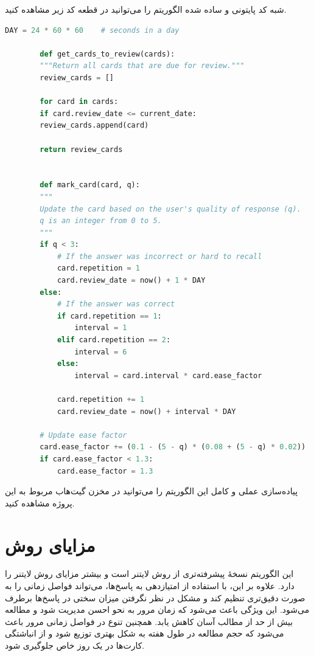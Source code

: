 \documentclass[12pt]{report}
\begin{document}
شبه کد پایتونی و ساده شده الگوریتم  را می‌توانید در قطعه کد زیر مشاهده کنید.
\begin{latin}
    
    \begin{lstlisting}[language=Python]
        DAY = 24 * 60 * 60    # seconds in a day
        
        def get_cards_to_review(cards):
        """Return all cards that are due for review."""
        review_cards = []
        
        for card in cards:
        if card.review_date <= current_date:
        review_cards.append(card)
        
        return review_cards
        
        
        def mark_card(card, q):
        """
        Update the card based on the user's quality of response (q).
        q is an integer from 0 to 5.
        """
        if q < 3:
            # If the answer was incorrect or hard to recall
            card.repetition = 1
            card.review_date = now() + 1 * DAY
        else:
            # If the answer was correct
            if card.repetition == 1:
                interval = 1
            elif card.repetition == 2:
                interval = 6
            else:
                interval = card.interval * card.ease_factor
            
            card.repetition += 1
            card.review_date = now() + interval * DAY
            
        # Update ease factor
        card.ease_factor += (0.1 - (5 - q) * (0.08 + (5 - q) * 0.02))
        if card.ease_factor < 1.3:
            card.ease_factor = 1.3
    \end{lstlisting}
\end{latin}

پیاده‌سازی عملی و کامل این الگوریتم را می‌توانید در مخزن گیت‌هاب مربوط به این پروژه مشاهده کنید.

\section{مزایای روش }
این الگوریتم نسخهٔ پیشرفته‌تری از روش لایتنر است و بیشتر مزایای روش لایتنر را دارد.
    علاوه بر این، با استفاده از امتیازدهی به پاسخ‌ها، می‌تواند فواصل زمانی را به صورت دقیق‌تری تنظیم کند و مشکل در نظر نگرفتن میزان سختی در پاسخ‌ها برطرف می‌شود.
این ویژگی باعث می‌شود که زمان مرور به نحو احسن مدیریت شود و مطالعه بیش از حد از مطالب آسان کاهش یابد.
همچنین تنوع در فواصل زمانی مرور باعث می‌شود که حجم مطالعه در طول هفته به شکل بهتری توزیع شود و از انباشتگی کارت‌ها در یک روز خاص جلوگیری شود.
\end{document}
